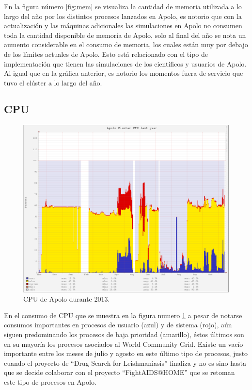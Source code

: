 En la figura número \ref{fig:mem} se visualiza la cantidad de memoria utilizada a lo largo del año por los distintos procesos lanzados en Apolo, es notorio que con la actualización y las máquinas adicionales las simulaciones en Apolo no consumen toda la cantidad disponible de memoria de Apolo, solo al final del año se nota un aumento considerable en el consumo de memoria, los cuales están muy por debajo de los límites actuales de Apolo. Esto está relacionado con el tipo de implementación que tienen las simulaciones de los científicos y usuarios de Apolo. Al igual que en la gráfica anterior, es notorio los momentos fuera de servicio que tuvo el clúster a lo largo del año.

\subsection{CPU}
\begin{figure}[ht]
  \centering
  \includegraphics[scale=0.45]{imgs/cpu2013.png}
  \caption{CPU de Apolo durante 2013.}
  \label{fig:cpu}
\end{figure}

En el consumo de CPU que se muestra en la figura numero \ref{fig:cpu} a pesar de notarse consumos importantes en procesos de usuario (azul) y de sistema (rojo), aún siguen predominando los procesos de baja prioridad (amarillo), éstos últimos son en su mayoría los procesos asociados al World Community Grid. Existe un vacío importante entre los meses de julio y agosto en este último tipo de procesos, justo cuando el proyecto de ``Drug Search for Leishmaniasis'' finaliza y no es sino hasta que se decide colaborar con el proyecto ``FightAIDS@HOME'' que se retoman este tipo de procesos en Apolo.

